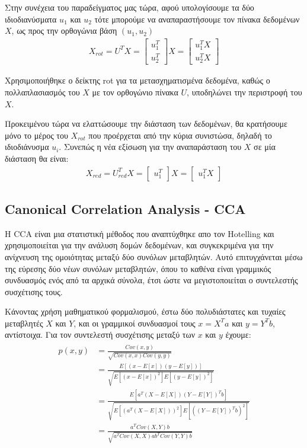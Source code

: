 \documentclass[11pt,a4paper,english,greek,twoside]{../Thesis}
\begin{document}
\par Στην συνέχεια του παραδείγματος μας τώρα, αφού υπολογίσουμε τα δύο ιδιοδιανύσματα $u_1$ και $u_2$ τότε μπορούμε να αναπαραστήσουμε τον πίνακα δεδομένων $X$, ως προς την ορθογώνια βάση $(u_1,u_2)$
\begin{align}
X_{rot} = U^TX =\begin{bmatrix}u_1^T\\u_2^T\end{bmatrix}X= \begin{bmatrix}u_1^TX\\u_2^TX\end{bmatrix}
\label{eq2}
\end{align}
\par Χρησιμοποιήθηκε ο δείκτης rot για τα μετασχηματισμένα δεδομένα, καθώς ο πολλαπλασιασμός του $X$ με τον ορθογώνιο πίνακα $U$, υποδηλώνει την περιστροφή του $X$.
\par Προκειμένου τώρα να ελαττώσουμε την διάσταση των δεδομένων, θα κρατήσουμε μόνο το μέρος του $X_{rot}$ που προέρχεται από την κύρια συνιστώσα, δηλαδή το ιδιοδιάνυσμα $u_i$. Συνεπώς η νέα εξίσωση για την αναπαράσταση του $X$ σε μία διάσταση θα είναι:
\begin{align}
X_{red} = U_{red}^TX =\begin{bmatrix}u_1^T\end{bmatrix}X= \begin{bmatrix}u_1^TX\end{bmatrix}
\label{eq3}
\end{align}
\subsection{Canonical Correlation Analysis - CCA}

\par Η CCA είναι μια στατιστική μέθοδος που αναπτύχθηκε απο τον Hotelling \cite{Hotelling1936-vk} και χρησιμοποιείται για την ανάλυση δομών δεδομένων, και συγκεκριμένα για την ανίχνευση της ομοιότητας μεταξύ δύο συνόλων μεταβλητών. Αυτό επιτυγχάνεται μέσω της εύρεσης δύο νέων συνόλων μεταβλητών, όπου το καθένα είναι γραμμικός συνδυασμός ενός από τα αρχικά σύνολα, έτσι ώστε να μεγιστοποιείται ο συντελεστής συσχέτισης τους. 
\par Κάνοντας χρήση μαθηματικού φορμαλισμού, έστω δύο πολυδιάστατες και τυχαίες μεταβλητές $X$ και $Y$, και οι γραμμικοί συνδυασμοί τους $x=X^Ta$ και $y=Y^Tb$, αντίστοιχα. Για τον συντελεστή συσχέτισης μεταξύ των $x$ και $y$ έχουμε:
\begin{align}
\begin{split} %
p(x,y)&=\frac{Cov(x,y)}{\sqrt{Cov(x,x)Cov(y,y)}} \\[2ex]
&=\frac{E[(x-E[x])(y-E[y])]}{\sqrt{E[(x-E[x])^2]E[(y-E[y])^2]}} \\[2ex]
&=\frac{E[a^T(X-E[X])(Y-E[Y])^Tb]}{\sqrt{E[(a^T(X-E[X]))^2]E[((Y-E[Y])^Tb)^2]}} \\[2ex]
&=\frac{a^TCov(X,Y)b}{\sqrt{a^TCov(X,X)ab^TCov(Y,Y)b}} \\
\label{eqCCA1}
\end{split}
\end{align}
\end{document}
